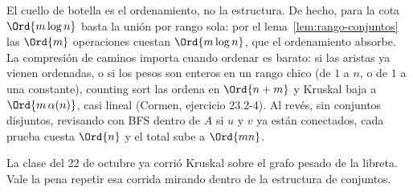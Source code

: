 \documentclass[11pt,letterpaper]{article}
\begin{document}
El cuello de botella es el ordenamiento, no la estructura. De hecho,
para la cota $\Ord{m \log n}$ basta la unión por rango sola: por el
lema~\ref{lem:rango-conjuntos} las $\Ord{m}$ operaciones cuestan
$\Ord{m \log n}$, que el ordenamiento absorbe. La compresión de
caminos importa cuando ordenar es barato: si las aristas ya vienen
ordenadas, o si los pesos son enteros en un rango chico (de $1$ a $n$,
o de $1$ a una constante), counting sort las ordena en $\Ord{n + m}$ y
Kruskal baja a $\Ord{m\,\alpha(n)}$, casi lineal (Cormen, ejercicio
23.2-4). Al revés, sin conjuntos disjuntos, revisando con BFS dentro
de $A$ si $u$ y $v$ ya están conectados, cada prueba cuesta $\Ord{n}$
y el total sube a $\Ord{mn}$.

La clase del 22 de octubre ya corrió Kruskal sobre el grafo pesado de
la libreta. Vale la pena repetir esa corrida mirando dentro de la
estructura de conjuntos.
\end{document}
